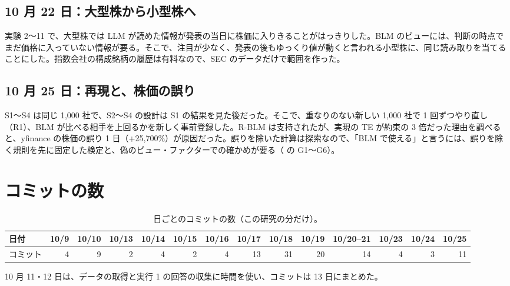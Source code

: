 \subsection{10 月 22 日：大型株から小型株へ}

実験 2〜11 で、大型株では LLM が読めた情報が発表の当日に株価に入りきることがはっきりした。BLM のビューには、判断の時点でまだ価格に入っていない情報が要る。そこで、注目が少なく、発表の後もゆっくり値が動くと言われる小型株に、同じ読み取りを当てることにした。指数会社の構成銘柄の履歴は有料なので、SEC のデータだけで範囲を作った。

\subsection{10 月 25 日：再現と、株価の誤り}

S1〜S4 は同じ 1,000 社で、S2〜S4 の設計は S1 の結果を見た後だった。そこで、重なりのない新しい 1,000 社で 1 回ずつやり直し（R1）、BLM が比べる相手を上回るかを新しく事前登録した。R-BLM は支持されたが、実現の TE が約束の 3 倍だった理由を調べると、yfinance の株価の誤り 1 日（+25,700\%）が原因だった。誤りを除いた計算は探索なので、「BLM で使える」と言うには、誤りを除く規則を先に固定した検定と、偽のビュー・ファクターでの確かめが要る（ の G1〜G6）。

\section{コミットの数}

\begin{table}[htbp]
\centering
\caption{日ごとのコミットの数（この研究の分だけ）。}
\small
\begin{tabular}{lrrrrrrrrrrrrr}
\toprule
日付 & 10/9 & 10/10 & 10/13 & 10/14 & 10/15 & 10/16 & 10/17 & 10/18 & 10/19 & 10/20--21 & 10/23 & 10/24 & 10/25 \\
\midrule
コミット & 4 & 9 & 2 & 4 & 2 & 4 & 13 & 31 & 20 & 14 & 4 & 3 & 11 \\
\bottomrule
\end{tabular}
\end{table}

10 月 11・12 日は、データの取得と実行 1 の回答の収集に時間を使い、コミットは 13 日にまとめた。
